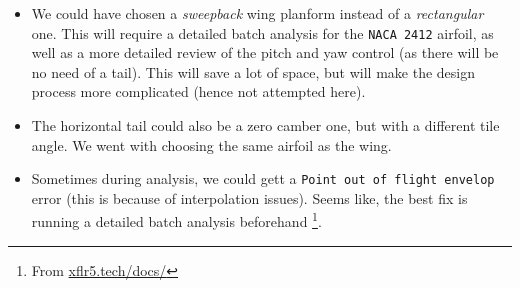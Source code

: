 \begin{itemize}
    \item We could have chosen a \emph{sweepback} wing planform instead of a \emph{rectangular} one. This will require a detailed batch analysis for the \texttt{NACA 2412} airfoil, as well as a more detailed review of the pitch and yaw control (as there will be no need of a tail). This will save a lot of space, but will make the design process more complicated (hence not attempted here).
    \item The horizontal tail could also be a zero camber one, but with a different tile angle. We went with choosing the same airfoil as the wing.
    \item Sometimes during analysis, we could gett a \texttt{Point out of flight envelop} error (this is because of interpolation issues). Seems like, the best fix is running a detailed batch analysis beforehand \footnote{From \href{https://www.xflr5.tech/docs/Point_Out_Of_Flight_Envelope.pdf}{xflr5.tech/docs/}}.
\end{itemize}
